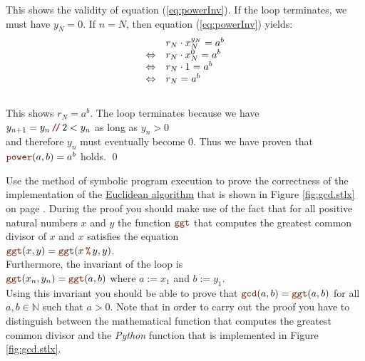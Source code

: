 This shows the validity of equation (\ref{eq:powerInv}).   If the  loop
terminates, we must have $y_N = 0$.  If $n=N$, then equation (\ref{eq:powerInv}) yields:
\\[0.2cm]
\hspace*{1.3cm}
$$
\begin{array}[t]{cl}
                 & r_N \cdot x_N^{y_N} = a^b \\
\Leftrightarrow  & r_N \cdot x_N^{0}  = a^b \\
\Leftrightarrow  & r_N \cdot 1       = a^b \\
\Leftrightarrow  & r_N               = a^b
\end{array}
$$
\\[0.2cm]
This shows $r_N = a^b$.  The  loop terminates because we have
\\[0.2cm]
\hspace*{1.3cm}
$y_{n+1} = y_n \dv 2 < y_n$ \quad as long as \quad $y_n > 0$
\\[0.2cm]
and therefore $y_n$ must eventually become $0$.  Thus we have proven that
$\mytt{power}(a,b) =a^b$ holds. \qed

\exerciseEng
Use the method of symbolic program execution to prove the correctness of the implementation of the
\href{https://en.wikipedia.org/wiki/Euclidean_algorithm}{Euclidean algorithm} that is shown in Figure
\ref{fig:gcd.stlx} on page \pageref{fig:gcd.stlx}.  During the proof 
you should make use of the fact that for all positive natural numbers $x$ and $y$ the function $\mytt{ggt}$
that computes the greatest common divisor of $x$ and $x$ satisfies the equation
\\[0.2cm]
\hspace*{1.3cm}
$\mytt{ggt}(x, y) = \mytt{ggt}(x \,\mytt{\%}\, y, y)$.
\\[0.2cm]
Furthermore, the invariant of the  loop is
\\[0.2cm]
\hspace*{1.3cm}
$\mytt{ggt}(x_n, y_n) = \mytt{ggt}(a, b)$ \quad where $a := x_1$ and $b := y_1$.
\\[0.2cm]
Using this invariant you should be able to prove that $\mytt{gcd}(a, b) = \mytt{ggt}(a, b)$ for all
$a, b \in \mathbb{N}$ such that $a > 0$.  Note that in order to carry out the proof you have to distinguish
between the mathematical function  that computes the greatest common divisor and the \textsl{Python}
function  that is implemented in Figure \ref{fig:gcd.stlx}.
\eox

